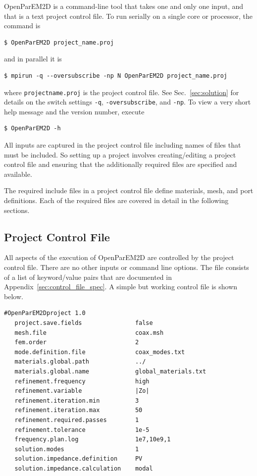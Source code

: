 \documentclass[titlepage]{article}
\renewcommand\_{\textunderscore\linebreak[1]}
\begin{document}
OpenParEM2D is a command-line tool that takes one and only one input, and that is a text project control file.  To run serially on a single core or processor, the command is
\begin{Verbatim}[fontsize=\small]
   $ OpenParEM2D project_name.proj
\end{Verbatim}
and in parallel it is
\begin{Verbatim}[fontsize=\small]
   $ mpirun -q --oversubscribe -np N OpenParEM2D project_name.proj
\end{Verbatim}
where \texttt{project\_name.proj} is the project control file.  See Sec.~\ref{sec:solution} for details on the switch settings \texttt{-q}, \texttt{-oversubscribe}, and \texttt{-np}. To view a very short help message and the version number, execute
\begin{Verbatim}[fontsize=\small]
   $ OpenParEM2D -h
\end{Verbatim}

All inputs are captured in the project control file including names of files that must be included. So setting up a project involves creating/editing a project control file and ensuring that the additionally required files are specified and available.

The required include files in a project control file define materials, mesh, and port definitions. Each of the required files are covered in detail in the following sections.

\subsection{Project Control File}

All aspects of the execution of OpenParEM2D are controlled by the project control file.  There are no other inputs or command line options.  The file consists of a list of keyword/value pairs that are documented in Appendix~\ref{sec:control_file_spec}.  A simple but working control file is shown below.

\begin{Verbatim}[fontsize=\small]
   #OpenParEM2Dproject 1.0
   project.save.fields               false
   mesh.file                         coax.msh
   fem.order                         2
   mode.definition.file              coax_modes.txt
   materials.global.path             ../
   materials.global.name             global_materials.txt
   refinement.frequency              high
   refinement.variable               |Zo|
   refinement.iteration.min          3
   refinement.iteration.max          50
   refinement.required.passes        1
   refinement.tolerance              1e-5
   frequency.plan.log                1e7,10e9,1
   solution.modes                    1
   solution.impedance.definition     PV
   solution.impedance.calculation    modal
\end{Verbatim}
\end{document}
